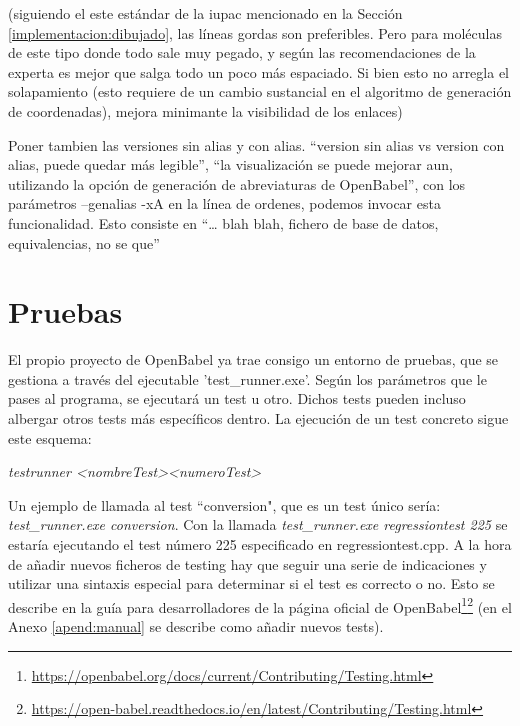 (siguiendo el este estándar de la iupac mencionado en la Sección \ref{implementacion:dibujado}, las líneas gordas son preferibles. Pero para moléculas de este tipo donde todo sale muy pegado, y según las recomendaciones de la experta es mejor que salga todo un poco más espaciado. Si bien esto no arregla el solapamiento (esto requiere de un cambio sustancial en el algoritmo de generación de coordenadas), mejora minimante la visibilidad de los enlaces)

Poner tambien las versiones sin alias y con alias. “version sin alias vs version con alias, puede quedar más legible”, “la visualización se puede mejorar aun, utilizando la opción de generación de abreviaturas de OpenBabel”, con los parámetros --genalias -xA en la línea de ordenes, podemos invocar esta funcionalidad. Esto consiste en “… blah blah, fichero de base de datos, equivalencias, no se que”

\section{Pruebas}
El propio proyecto de OpenBabel ya trae consigo un entorno de pruebas, que se gestiona a través del ejecutable 'test\_runner.exe'. Según los parámetros que le pases al programa, se ejecutará un test u otro. Dichos tests pueden incluso albergar otros tests más específicos dentro. La ejecución de un test concreto sigue este esquema: 
\begin{center}
    \textit{test\textunderscore runner \textless nombreTest\textgreater  \textless numeroTest\textgreater}    
\end{center}

Un ejemplo de llamada al test ``conversion", que es un test único sería: \textit{test\_runner.exe conversion}. Con la llamada \textit{test\_runner.exe regressiontest 225} se estaría ejecutando el test número 225 especificado en regressiontest.cpp. A la hora de añadir nuevos ficheros de testing hay que seguir una serie de indicaciones y utilizar una sintaxis especial para determinar si el test es correcto o no. Esto se describe en la guía para desarrolladores de la página oficial de OpenBabel\footnote{\url{https://openbabel.org/docs/current/Contributing/Testing.html}}\footnotecomma\footnote{\url{https://open-babel.readthedocs.io/en/latest/Contributing/Testing.html}} (en el Anexo \ref{apend:manual} se describe como añadir nuevos tests).

